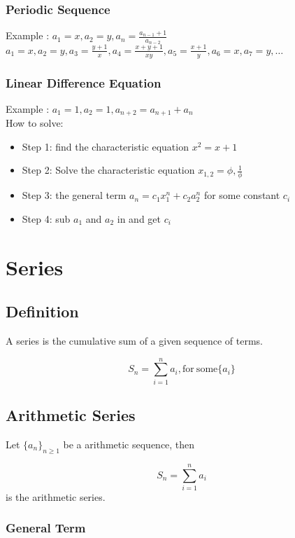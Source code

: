 \documentclass{article}
\begin{document}
\subsubsection{Periodic Sequence}

Example : $a_1=x,a_2=y, a_n=\frac{a_{n-1}+1}{a_{n-2}}$
\\

$a_1=x,a_2=y,a_3=\frac{y+1}{x}, a_4=\frac{x+y+1}{xy}, a_5 = \frac{x+1}{y}, a_6=x, a_7=y, \dots$

\subsubsection{Linear Difference Equation}

Example : $a_1=1, a_2=1, a_{n+2}=a_{n+1}+a_{n} $
\\
How to solve:
\begin{itemize}
    \item Step 1: find the characteristic equation $x^2=x+1$
    \item Step 2: Solve the characteristic equation $x_{1,2}=\phi,\frac{1}{\phi}$
    \item Step 3: the general term $a_n = c_1 x_1^n+ c_2 a_2^n$ for some constant $c_i$
    \item Step 4: sub $a_1$ and $a_2$ in and get $c_i$
\end{itemize}

\section{Series}

\subsection{Definition}

A series is the cumulative sum of a given sequence of terms.

$$S_n=\sum_{i=1}^{n}a_i \mathrm{,for \ some} \{a_i\}$$ 

\subsection{Arithmetic Series}

Let $\{a_n\}_{n\ge1}$ be a arithmetic sequence, then 

$$S_n=\sum_{i=1}^{n}a_i$$ 
is the arithmetic series.

\subsubsection{General Term}
\end{document}
